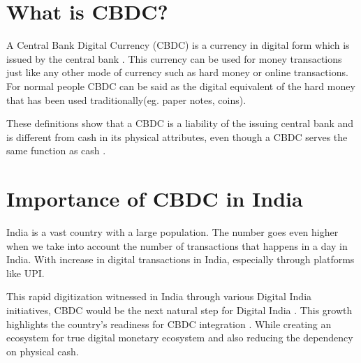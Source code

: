 

\section{What is CBDC?}
\label{chp1.2}

A Central Bank Digital Currency (CBDC) is a currency in digital form which is issued by the central bank \cite{boar2021}. This currency can be used for money transactions just like any other mode of currency such as hard money or online transactions.
For normal people CBDC can be said as the digital equivalent of the hard money that has been used traditionally(eg. paper notes, coins).

These definitions show that a CBDC is a liability of the issuing central bank and is different from cash in its physical attributes, even though a CBDC serves the same function as cash \cite{mengle2018}.


\section{Importance of CBDC in India}
\label{chp1.3}

India is a vast country with a large population. The number goes even higher when we take into account the number of transactions that happens in a day in India. With increase in digital transactions in India, especially through platforms like UPI.

This rapid digitization witnessed in India through various Digital India initiatives, CBDC would be the next natural step for Digital India \cite{rbi2023}. This growth highlights the country's readiness for CBDC integration \cite{bains2022, agarwal2021}.  While creating an ecosystem for true digital monetary ecosystem and also reducing the dependency on physical cash.

